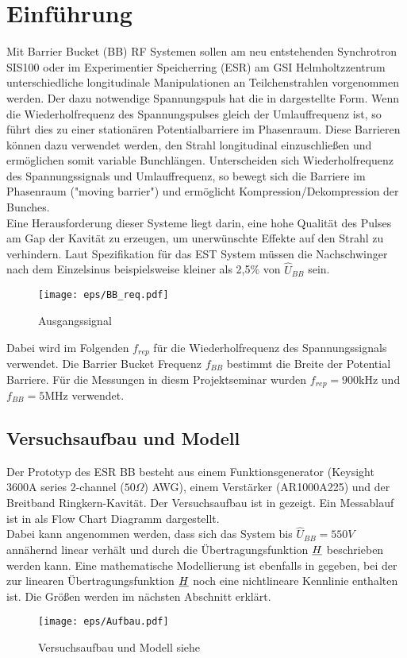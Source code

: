 \documentclass[../Report.tex]{subfiles}
\begin{document}
\chapter{Einführung}
\label{chap:einfuehrung}
Mit Barrier Bucket (BB) RF Systemen sollen am neu entstehenden Synchrotron SIS100 oder im Experimentier Speicherring (ESR) am GSI Helmholtzzentrum unterschiedliche longitudinale Manipulationen an Teilchenstrahlen vorgenommen werden. Der dazu notwendige Spannungspuls hat die in  dargestellte Form. Wenn die Wiederholfrequenz des Spannungspulses gleich der Umlauffrequenz ist, so führt dies zu einer stationären Potentialbarriere im Phasenraum. Diese Barrieren können dazu verwendet werden, den Strahl longitudinal einzuschließen und ermöglichen somit variable Bunchlängen. Unterscheiden sich Wiederholfrequenz des Spannungssignals und Umlauffrequenz, so bewegt sich die Barriere im Phasenraum ("moving barrier") und ermöglicht Kompression/Dekompression der Bunches.\\ Eine Herausforderung dieser Systeme liegt darin, eine hohe Qualität des Pulses am Gap der Kavität zu erzeugen, um unerwünschte Effekte auf den Strahl zu verhindern. Laut Spezifikation für das EST System müssen die Nachschwinger nach dem Einzelsinus beispielsweise kleiner als 2,5\% von $\hat{U}_{BB}$ sein.
\begin{figure}[H]
  \centering
  \texttt{[image: eps/BB\_req.pdf]}
  \caption{Ausgangssignal}
  \label{fig:BB_req}
\end{figure}

Dabei wird im Folgenden $f_{rep}$ für die Wiederholfrequenz des Spannungssignals verwendet. Die Barrier Bucket Frequenz $f_{BB}$ bestimmt die Breite der Potential Barriere. Für die Messungen in diesm Projektseminar wurden ${f_{rep} = 900 \si{\kilo \hertz}}$ und ${f_{BB} = 5 \si{\mega \hertz}}$ verwendet.


\section[Modell und Konvention]{Versuchsaufbau und Modell}
\label{sec:einf.modell_BB}
Der Prototyp des ESR BB besteht aus einem Funktionsgenerator (Keysight 3600A series 2-channel ($50\Omega $) AWG), einem Verstärker (AR1000A225) und der Breitband Ringkern-Kavität. Der Versuchsaufbau ist in  gezeigt. Ein Messablauf ist in  als Flow Chart Diagramm dargestellt.\\
Dabei kann angenommen werden, dass sich das System bis $\hat{U}_{BB} = 550V$ annähernd linear verhält und durch die Übertragungsfunktion $\underline{H}$ beschrieben werden kann. Eine mathematische Modellierung ist ebenfalls in  gegeben, bei der zur linearen Übertragungsfunktion $\underline{H}$ noch eine nichtlineare Kennlinie enthalten ist. Die Größen werden im nächsten Abschnitt erklärt.
\begin{figure}[H]
	\centering
	\texttt{[image: eps/Aufbau.pdf]}
	\caption{Versuchsaufbau und Modell siehe \cite{harzheim}}
  	\label{fig:Aufbau}
\end{figure}
\end{document}

